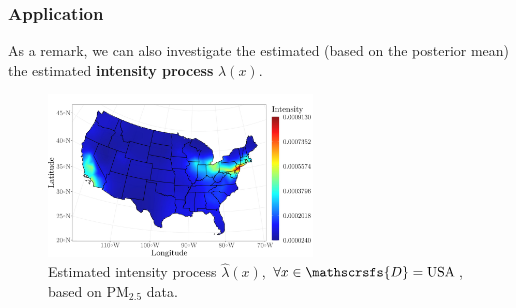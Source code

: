 \documentclass[10pt, aspectratio = 169, handout]{beamer} %
\let\oldtextbf\textbf
\renewcommand\textbf[1]{\textcolor{titles}{\oldtextbf{#1}}}
\begin{document}
    \begin{frame}[t]
        \frametitle{Application}
		\justifying

        As a remark, we can also investigate the estimated (based on the posterior mean) the estimated \textbf{intensity process} $\lambda(x)$.
        
        \vspace{-6pt}

        \begin{figure}[!ht]
        	\centering
        	\includegraphics[width = 0.625\textwidth]{Images/intensity.jpeg} \vspace{-6pt}
            \caption{Estimated intensity process $\hat{\lambda}(x)$, $\forall x \in \mathscrsfs{D} = \text{USA}$, based on $\text{PM}_{2.5}$ data.}
        	\label{fig:S-intensity_usa}
        \end{figure}
        
	\end{frame}
\end{document}
